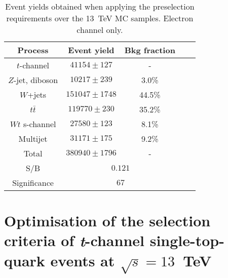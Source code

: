 \begin{table} [htb]
\begin{center}
\begin{tabular}{|c|c|c|c|c|} 
 \hline
 Process & Event yield & Bkg fraction \\ \hline
 $t$-channel & $41154 \pm 127 $ & - \\ 
 $Z$-jet, diboson & $10217 \pm 239 $&  3.0\% \\ 
 $W$+jets & $151047 \pm  1748$ & 44.5\%\\
 $t\bar{t}$& $119770 \pm 230$ & 35.2\%\\
 $Wt$ s-channel & $27580 \pm 123$ & 8.1\% \\
 Multijet&$31171 \pm 175 $&9.2\%\\
 \hline
 Total & $380940 \pm 1796$ & - \\ \hline \hline
 S/B &\multicolumn{2}{|c|}{$0.121$} \\ \hline
 Significance &\multicolumn{2}{|c|}{$67$} \\ \hline
\end{tabular}
\caption{Event yields obtained when applying the preselection requirements 
over the 13~TeV MC samples. Electron channel only.}
\label{Table:PreselectionEventYields}
\end{center}
\end{table}







\section{Optimisation of the selection criteria of \textit{t}-channel single-top-quark events at \boldmath$\sqrt{s} = 13$~TeV} \label{sec:ch05} %


